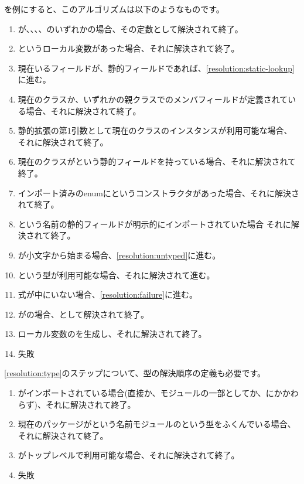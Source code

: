 


を例にすると、このアルゴリズムは以下のようなものです。

\begin{enumerate}
	\item {}が、、、、のいずれかの場合、その定数として解決されて終了。
	\item {}というローカル変数があった場合、それに解決されて終了。
	\item 現在いるフィールドが、静的フィールドであれば、\ref{resolution:static-lookup}に進む。
	\item 現在のクラスか、いずれかの親クラスでのメンバフィールドが定義されている場合、それに解決されて終了。
	\item\label{resolution:static-extension} 静的拡張の第1引数として現在のクラスのインスタンスが利用可能な場合、それに解決されて終了。
	\item\label{resolution:static-lookup} 現在のクラスがという静的フィールドを持っている場合、それに解決されて終了。
	\item\label{resolution:enum-ctor} インポート済みのenumにというコンストラクタがあった場合、それに解決されて終了。
	\item {}という名前の静的フィールドが明示的にインポートされていた場合 それに解決されて終了。
	\item {}が小文字から始まる場合、\ref{resolution:untyped}に進む。
	\item\label{resolution:type} という型が利用可能な場合、それに解決されて進む。
	\item\label{resolution:untyped} 式が中にいない場合、\ref{resolution:failure}に進む。
	\item {}がの場合、として解決されて終了。
	\item ローカル変数のを生成し、それに解決されて終了。
	\item\label{resolution:failure} 失敗
\end{enumerate}

\ref{resolution:type}のステップについて、型の解決順序の定義も必要です。

\begin{enumerate}
	\item\label{resolution:import} がインポートされている場合(直接か、モジュールの一部としてか、にかかわらず)、それに解決されて終了。
	\item 現在のパッケージがという名前モジュールのという型をふくんでいる場合、それに解決されて終了。
	\item {}がトップレベルで利用可能な場合、それに解決されて終了。
	\item 失敗
\end{enumerate}

